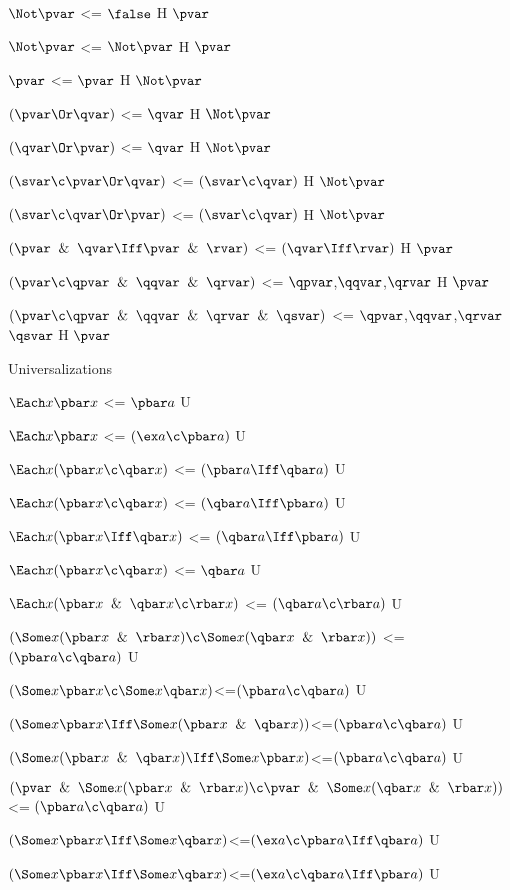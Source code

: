 $\Not \pvar$ <= $\false$ H $\pvar$ 

$\Not \pvar$ <= $\Not\pvar$ H $\pvar$

$\pvar$ <= $\pvar$ H $\Not\pvar$

$(\pvar \Or \qvar)$ <= $\qvar$ H $\Not\pvar$

$(\qvar \Or \pvar)$ <= $\qvar$ H $\Not\pvar$

$(\svar \c \pvar \Or \qvar)$ <= $(\svar \c \qvar)$ H $\Not\pvar$

$(\svar \c \qvar \Or \pvar)$ <= $(\svar \c \qvar)$ H $\Not\pvar$

$(\pvar \And \qvar \Iff \pvar \And \rvar)$ <= $(\qvar \Iff \rvar)$ H $\pvar$

$(\pvar \c \qpvar \And \qqvar \And \qrvar)$ <= $\qpvar$,$\qqvar$,$\qrvar$ H $\pvar$

$(\pvar \c \qpvar \And \qqvar \And \qrvar\And \qsvar)$ <= $\qpvar$,$\qqvar$,$\qrvar$ $\qsvar$ H $\pvar$
\lineb


Universalizations
\lineb

$\Each x \pbar x$ <= $\pbar a$ U

$\Each x \pbar x$ <= $(\ex a \c \pbar a)$ U

$\Each x( \pbar x \c \qbar x)$ <= $(\pbar a \Iff \qbar a)$ U

$\Each x( \pbar x \c \qbar x)$ <= $(\qbar a \Iff \pbar a)$ U

$\Each x(\pbar x \Iff \qbar x)$ <= $(\qbar a \Iff \pbar a)$ U

$\Each x( \pbar x \c \qbar x)$ <= $\qbar a$ U

$\Each x (\pbar x \And \qbar x \c \rbar x)$ <= $(\qbar a \c \rbar a)$ U

$(\Some x (\pbar x \And \rbar x)\c \Some x (\qbar x\And \rbar x))$ <= $(\pbar a \c \qbar a)$ U

$(\Some x \pbar x \c \Some x \qbar x)$<=$(\pbar a \c \qbar a)$ U

$(\Some x \pbar x \Iff \Some x (\pbar x \And \qbar x))$<=$(\pbar a \c \qbar a)$ U

$(\Some x (\pbar x\And \qbar x) \Iff \Some x \pbar x)$<=$(\pbar a \c \qbar a)$ U

$(\pvar \And \Some x (\pbar x \And \rbar x) \c \pvar \And \Some x (\qbar x \And \rbar x))$<= $(\pbar a \c \qbar a)$ U

$(\Some x \pbar x \Iff \Some x\qbar x)$<=$(\ex a \c \pbar a \Iff\qbar a)$ U

$(\Some x \pbar x \Iff \Some x\qbar x)$<=$(\ex a \c \qbar a \Iff\pbar a)$ U

